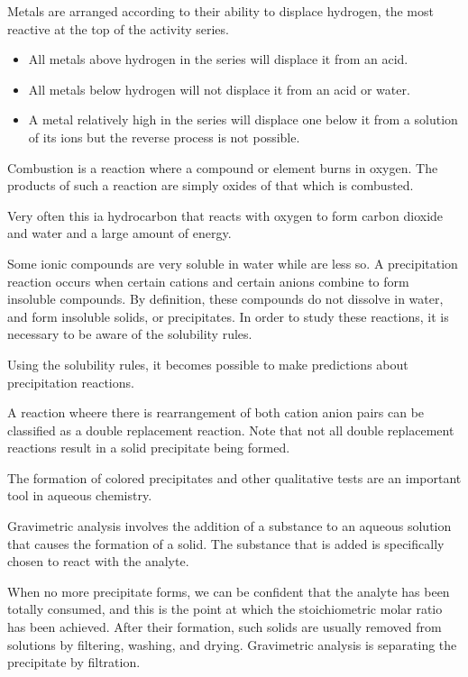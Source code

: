 \documentclass[../chem.tex]{subfiles}
\begin{document}
Metals are arranged according to their ability to displace hydrogen, the most reactive at the top of the activity series.
\begin{itemize}
    \item All metals above hydrogen in the series will displace it from an acid.
    \item All metals below hydrogen will not displace it from an acid or water.
    \item A metal relatively high in the series will displace one below it from a solution of its ions but the reverse process is not possible.
\end{itemize}

Combustion is a reaction where a compound or element burns in oxygen. The products of such a reaction are simply oxides of that which is combusted.

Very often this ia hydrocarbon that reacts with oxygen to form carbon dioxide and water and a large amount of energy.

Some ionic compounds are very soluble in water while are less so. A precipitation reaction occurs when certain cations and certain anions 
combine to form insoluble compounds. By definition, these compounds do not dissolve in water, and form insoluble solids, or precipitates. 
In order to study these reactions, it is necessary to be aware of the solubility rules.

Using the solubility rules, it becomes possible to make predictions about precipitation reactions. 

A reaction wheere there is rearrangement of both cation anion pairs can be classified as a double replacement reaction. Note that not all 
double replacement reactions result in a solid precipitate being formed.

The formation of colored precipitates and other qualitative tests are an important tool in aqueous chemistry.

Gravimetric analysis involves the addition of a substance to an aqueous solution that causes the formation of a solid. The substance that 
is added is specifically chosen to react with the analyte.

When no more precipitate forms, we can be confident that the analyte has been totally consumed, and this is the point at which the stoichiometric 
molar ratio has been achieved. After their formation, such solids are usually removed from solutions by filtering, washing, and drying. Gravimetric 
analysis is separating the precipitate by filtration.
\end{document}
